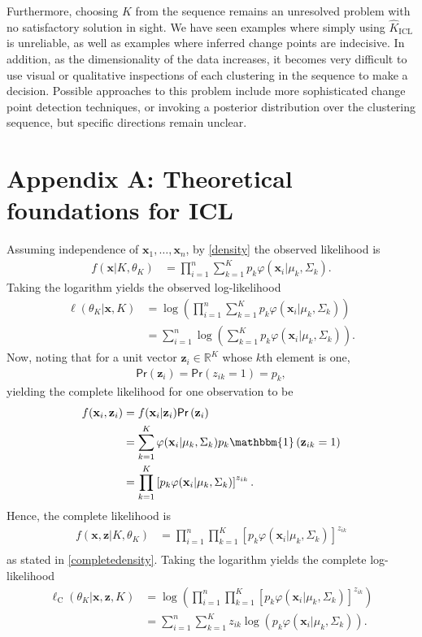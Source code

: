 \documentclass{uwstat572}
\newcommand*\reals{\mathbb{R}}
\newcommand*\ba{\[ \begin{aligned}}
\newcommand*\ea{\end{aligned} \]}
\newcommand*\ind[1]{\mathbbm{1}\left(#1\right)}
\newcommand*\estim[1]{\widehat{#1}}
\newcommand*\bx{\mathbf{x}}
\newcommand*\bz{\mathbf{z}}
\renewcommand\;{\,}
\renewcommand\phi{\varphi}
\renewcommand\Pr[1]{ \mathsf{Pr}\left(#1\right) }
\begin{document}
Furthermore, choosing $K$ from the sequence remains an unresolved problem with no satisfactory solution in sight.
We have seen examples where simply using $\estim K_\text{ICL}$ is unreliable, as well as examples where inferred change points are indecisive.
In addition, as the dimensionality of the data increases, it becomes very difficult to use visual or qualitative inspections of each clustering in the sequence to make a decision.
Possible approaches to this problem include more sophisticated change point detection techniques, or invoking a posterior distribution over the clustering sequence, but specific directions remain unclear.

 



\section*{Appendix A: Theoretical foundations for ICL}
Assuming independence of $\bx_1, \dotsc, \bx_n$, by \eqref{density} the observed likelihood is
\ba
f(\bx | K, \theta_K)
	& = \prod_{i=1}^n \sum_{k=1}^K p_k \phi(\bx_i | \mu_k, \Sigma_k).
\ea
Taking the logarithm yields the observed log-likelihood
\begin{equation}\label{l}
\begin{split}
\ell(\theta_K | \bx, K)
	& = \log\left( \prod_{i=1}^n \sum_{k=1}^K p_k \phi(\bx_i | \mu_k, \Sigma_k) \right) \\
	& = \sum_{i=1}^n \log \left( \sum_{k=1}^K p_k \phi(\bx_i | \mu_k, \Sigma_k) \right).
\end{split}
\end{equation}
Now, noting that for a unit vector $\bz_i \in \reals^K$ whose $k$th element is one, 
\ba
\Pr{\bz_i} = \Pr{z_{ik} = 1} = p_k,
\ea
yielding the complete likelihood for one observation to be
\ba
f(\bx_i, \bz_i)
	& = f(\bx_i | \bz_i) \Pr{\bz_i} \\
	& = \sum_{k=1}^K \phi(\bx_i | \mu_k, \Sigma_k) p_k \ind{\bz_{ik} = 1}
		 \\
	& = \prod_{k = 1}^K 
		\left[ p_k \phi(\bx_i | \mu_k, \Sigma_k) \right]^{z_{ik}}.
\ea
Hence, the complete likelihood is
\ba
f(\bx, \bz| K, \theta_K)
	& = \prod_{i=1}^n \prod_{k = 1}^K 
		\left[ p_k \phi(\bx_i | \mu_k, \Sigma_k) \right]^{z_{ik}} \\
\ea
as stated in \eqref{completedensity}.
Taking the logarithm yields the complete log-likelihood
\begin{equation}\label{lc}
\begin{split}
\ell_\text{C}(\theta_K | \bx, \bz, K)
	& = \log\left(\prod_{i=1}^n \prod_{k = 1}^K 
		\left[ p_k \phi(\bx_i | \mu_k, \Sigma_k) \right]^{z_{ik}} \right)\\
	& = \sum_{i=1}^n \sum_{k=1}^K z_{ik} \log \left( p_k \phi(\bx_i | \mu_k, \Sigma_k) \right).
\end{split}
\end{equation}
\end{document}
